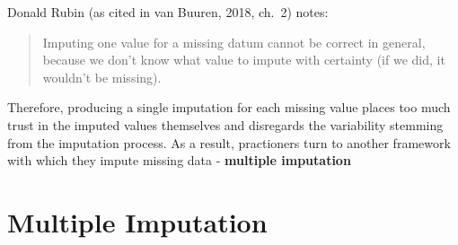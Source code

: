 \documentclass[12pt,oneside]{chicagocapstone}
\begin{document}
Donald Rubin (as cited in van Buuren, 2018, ch.~2) notes:
\begin{quote}
Imputing one value for a missing datum cannot be correct in general,
because we don't know what value to impute with certainty (if we did, it
wouldn't be missing).
\end{quote}
Therefore, producing a single imputation for each missing value places
too much trust in the imputed values themselves and disregards the
variability stemming from the imputation process. As a result,
practioners turn to another framework with which they impute missing
data - \textbf{multiple imputation}

\section*{Multiple Imputation}\label{background-multiple-imputation}
\end{document}
